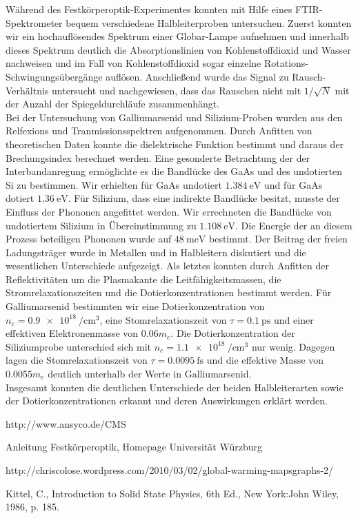 \documentclass[paper=a4,fontsize=10pt,DIV=18,twocolumn,parskip=half]{scrartcl}
\numberwithin{equation}{section}    %
\begin{document}
Während des Festkörperoptik-Experimentes konnten mit Hilfe eines 
FTIR-Spektrometer bequem verschiedene Halbleiterproben untersuchen. Zuerst 
konnten wir ein hochauflösendes Spektrum einer Globar-Lampe aufnehmen und 
innerhalb dieses Spektrum deutlich die Absorptionslinien von Kohlenstoffdioxid 
und Wasser nachweisen und im Fall von Kohlenstoffdioxid sogar einzelne 
Rotations-Schwingungsübergänge auflösen.
Anschließend wurde das Signal zu Rausch-Verhältnis untersucht und nachgewiesen, 
dass das Rauschen nicht mit $1/\sqrt{N}$ mit der Anzahl der Spiegeldurchläufe 
zusammenhängt.\\
Bei der Untersuchung von Galliumarsenid und Silizium-Proben wurden aus den 
Relfexions und Tranmissionsspektren aufgenommen. Durch Anfitten von 
theoretischen Daten konnte die dielektrische Funktion bestimmt und daraus der 
Brechungsindex berechnet werden.
Eine gesonderte Betrachtung der der Interbandanregung ermöglichte es die 
Bandlücke des  GaAs und des undotierten Si zu bestimmen. Wir erhielten für GaAs 
undotiert $\SI{1.384}{\eV}$ und für GaAs dotiert $\SI{1.36}{\eV}$. Für Silizium, 
dass eine indirekte Bandlücke besitzt, musste der Einfluss der Phononen 
angefittet werden. Wir errechneten die Bandlücke von undotiertem Silizium in 
Übereinstimmung zu $\SI{1.108}{\eV}$. Die Energie der an diesem Prozess 
beteiligen Phononen wurde auf $\SI{48}{\milli\eV}$ bestimmt. Der Beitrag der 
freien Ladungsträger wurde in Metallen und in Halbleitern diskutiert und die 
wesentlichen Unterschiede aufgezeigt. Als letztes konnten durch Anfitten der 
Reflektivitäten um die Plasmakante die Leitfähigkeitsmassen, die 
Stromrelaxationszeiten und die Dotierkonzentrationen bestimmt werden. Für 
Galliumarsenid bestimmten wir eine Dotierkonzentration von 
$n_e=\SI{0.9e18}{\per\centi\meter^3}$, eine Stomrelaxationszeit von 
$\tau=\SI{0.1}{\pico\second}$ und einer effektiven Elektronenmasse von 
$0.06m_e$. Die Dotierkonzentration der Siliziumprobe unterschied sich mit 
$n_e=\SI{1.1e18}{\per\centi\meter^3}$ nur wenig. Dagegen lagen die 
Stomrelaxationszeit von $\tau=\SI{0.0095}{\femto\second}$ und die effektive 
Masse von $0.0055m_e$ deutlich unterhalb der Werte in Galliumarsenid.\\
Insgesamt konnten die deutlichen Unterschiede der beiden Halbleiterarten sowie 
der Dotierkonzentrationen erkannt und deren Auswirkungen erklärt werden.
\begin{thebibliography}{}   

 http://www.ansyco.de/CMS

Anleitung Festkörperoptik, Homepage Universität Würzburg

http://chriscolose.wordpress.com/2010/03/02/global-warming-mapsgraphs-2/

 Kittel, C., Introduction to Solid State Physics, 6th Ed., New York:John Wiley, 1986, p. 185. 

\end{thebibliography}
\end{document}
